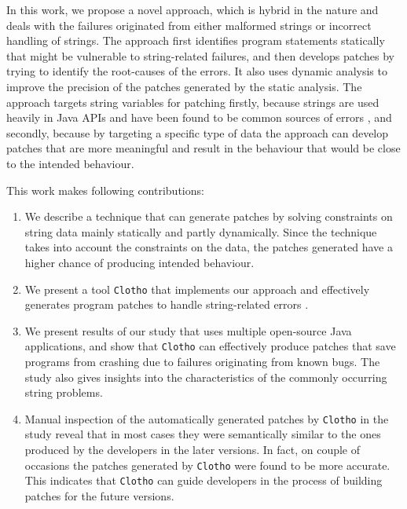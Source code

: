 
In this work, we propose a novel approach, which is hybrid in the nature and deals with the failures originated from either
malformed strings or incorrect handling of strings. The approach first identifies program statements statically that
might be vulnerable to string-related failures, and then develops patches by trying to identify the root-causes
of the errors. It also uses dynamic analysis to improve the precision of the patches generated by the static analysis.
The approach targets string variables for patching firstly, because strings are used heavily in Java APIs and have been
found to be common sources of errors \cite{}, and secondly, because by targeting a specific type of data the approach
can develop patches that are more meaningful and result in the behaviour that would be close to the intended
behaviour.

This work makes following contributions:
\begin{enumerate}
\item We describe a technique that can generate patches by solving constraints on string data mainly statically
and partly dynamically. Since the technique takes into account the constraints on the data, the patches generated
have a higher chance of producing intended behaviour.

\item We present a tool \texttt{Clotho} that implements our approach and effectively generates program
patches to handle string-related errors \cite{}.

\item We present results of our study that uses multiple open-source Java applications, and show that \texttt{Clotho}
can effectively produce patches that save programs from crashing due to failures originating from known bugs. The study
also gives insights into the characteristics of the commonly occurring string problems.

\item Manual inspection of the automatically generated patches by \texttt{Clotho} in the study reveal that in most cases
they were semantically similar to the ones produced by the developers in the later versions. In fact, on couple of occasions
the patches generated by \texttt{Clotho} were found to be more accurate. This indicates that \texttt{Clotho} can guide 
developers in the process of building patches for the future versions.
\end{enumerate}


